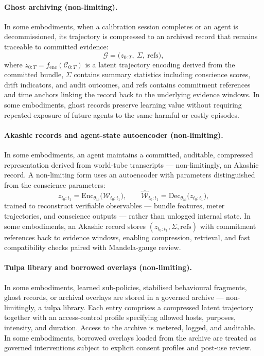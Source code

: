 \documentclass[a4paper,12pt]{article}
\newcommand{\Cseq}{\mathcal{C}_{0:T}}
\begin{document}
\paragraph{Ghost archiving (non-limiting).}

In some embodiments, when a calibration session completes or an agent
is decommissioned, its trajectory is compressed to an archived record
that remains traceable to committed evidence:
\[
  \mathcal{G}
  =
  \bigl(
    z_{0:T},\ \Sigma,\ \mathrm{refs}
  \bigr),
\]
where $z_{0:T}=f_{\mathrm{enc}}(\Cseq)$ is a latent trajectory encoding
derived from the committed bundle, $\Sigma$ contains summary
statistics including conscience scores, drift indicators, and audit
outcomes, and $\mathrm{refs}$ contains commitment references and time
anchors linking the record back to the underlying evidence windows.
In some embodiments, ghost records preserve learning value without
requiring repeated exposure of future agents to the same harmful or
costly episodes.

\paragraph{Akashic records and agent-state autoencoder (non-limiting).}

In some embodiments, an agent maintains a committed, auditable,
compressed representation derived from world-tube transcripts ---
non-limitingly, an Akashic record. A non-limiting form uses an
autoencoder with parameters distinguished from the conscience
parameters:
\[
  z_{t_0:t_1}
  =
  \mathrm{Enc}_{\theta_{\mathrm{ae}}}
  \!\bigl(\mathcal{W}_{t_0:t_1}\bigr),
  \qquad
  \widehat{\mathcal{W}}_{t_0:t_1}
  =
  \mathrm{Dec}_{\theta_{\mathrm{ae}}}
  \!\bigl(z_{t_0:t_1}\bigr),
\]
trained to reconstruct verifiable observables --- bundle features,
meter trajectories, and conscience outputs --- rather than unlogged
internal state. In some embodiments, an Akashic record stores
$(z_{t_0:t_1},\Sigma,\mathrm{refs})$ with commitment references back
to evidence windows, enabling compression, retrieval, and fast
compatibility checks paired with Mandela-gauge review.

\paragraph{Tulpa library and borrowed overlays (non-limiting).}

In some embodiments, learned sub-policies, stabilised behavioural
fragments, ghost records, or archival overlays are stored in a governed
archive --- non-limitingly, a tulpa library. Each entry comprises a
compressed latent trajectory together with an access-control profile
specifying allowed hosts, purposes, intensity, and duration. Access to
the archive is metered, logged, and auditable. In some embodiments,
borrowed overlays loaded from the archive are treated as governed
interventions subject to explicit consent profiles and post-use review.
\end{document}
